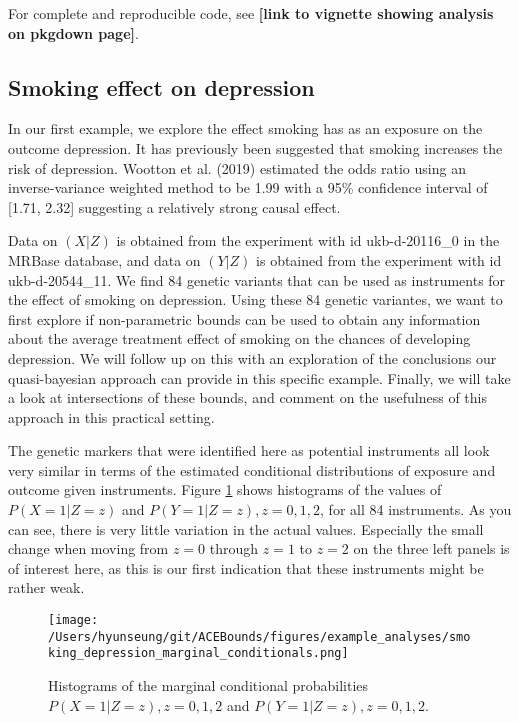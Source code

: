 \documentclass[
]{article}
\theoremstyle{plain}
\begin{document}
{For complete and reproducible code, see \textbf{{[}link to vignette showing analysis on pkgdown page{]}}.

\hypertarget{smoking-effect-on-depression}{%
\subsection{Smoking effect on depression}\label{smoking-effect-on-depression}}

In our first example, we explore the effect smoking has as an exposure on the outcome depression. It has previously been suggested that smoking increases the risk of depression. Wootton et al. (2019) estimated the odds ratio using an inverse-variance weighted method to be 1.99 with a 95\% confidence interval of {[}1.71, 2.32{]} suggesting a relatively strong causal effect.

Data on \((X|Z)\) is obtained from the experiment with id ukb-d-20116\_0 in the MRBase database, and data on \((Y|Z)\) is obtained from the experiment with id ukb-d-20544\_11. We find 84 genetic variants that can be used as instruments for the effect of smoking on depression. Using these 84 genetic variantes, we want to first explore if non-parametric bounds can be used to obtain any information about the average treatment effect of smoking on the chances of developing depression. We will follow up on this with an exploration of the conclusions our quasi-bayesian approach can provide in this specific example. Finally, we will take a look at intersections of these bounds, and comment on the usefulness of this approach in this practical setting.

The genetic markers that were identified here as potential instruments all look very similar in terms of the estimated conditional distributions of exposure and outcome given instruments. Figure \ref{fig:smoking_on_depression_marginals} shows histograms of the values of \(P(X = 1|Z = z)\) and \(P(Y = 1|Z = z), z = 0,1,2\), for all 84 instruments. As you can see, there is very little variation in the actual values. Especially the small change when moving from \(z = 0\) through \(z = 1\) to \(z = 2\) on the three left panels is of interest here, as this is our first indication that these instruments might be rather weak.

\begin{figure}[H]
  \texttt{[image: /Users/hyunseung/git/ACEBounds/figures/example\_analyses/smoking\_depression\_marginal\_conditionals.png]}
  \caption{Histograms of the marginal conditional probabilities $P(X = 1 | Z = z), z = 0,1,2$ and $P(Y = 1 | Z = z), z=0,1,2$.}
  \label{fig:smoking_on_depression_marginals}
\end{figure}

}
\end{document}
